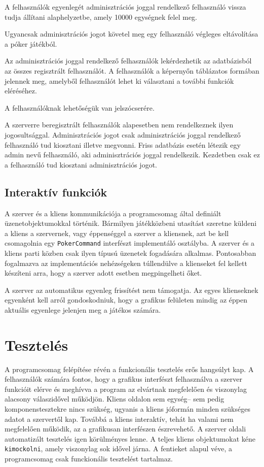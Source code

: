 A felhasználók egyenlegét adminisztrációs joggal rendelkező felhasználó vissza tudja állítani alaphelyzetbe, amely 10000 egységnek felel meg.

Ugyancsak adminisztrációs jogot követel meg egy felhasználó végleges eltávolítása a póker játékból.

Az adminisztrációs joggal rendelkező felhasználók lekérdezhetik az adatbázisból az összes regisztrált felhasználót. A felhasználók a képernyőn táblázatos formában jelennek meg, amelyből felhasználót lehet ki választani a további funkciók eléréséhez.

A felhasználóknak lehetőségük van jelszócserére.

A szerverre beregisztrált felhasználók alapesetben nem rendelkeznek ilyen jogosultsággal. Adminisztrációs jogot csak adminisztrációs joggal rendelkező felhasználó tud kiosztani illetve megvonni. Friss adatbázis esetén létezik egy admin nevű felhasználó, aki adminisztrációs joggal rendelkezik. Kezdetben csak ez a felhasználó tud kiosztani adminisztrációs jogot.

\clearpage

\subsection{Interaktív funkciók}
A szerver és a kliens kommunikációja a programcsomag által definiált üzenetobjektumokkal történik. Bármilyen játékközbeni utasítást szeretne küldeni a kliens a szervernek, vagy éppenséggel a szerver a kliensnek, azt be kell csomagolnia egy \texttt{PokerCommand} interfészt implementáló osztályba. A szerver és a kliens parti közben csak ilyen típusú üzenetek fogadására alkalmas. Pontosabban fogalmazva az implementációs nehézségeken túllendülve a klienseket fel kellett készíteni arra, hogy a szerver adott esetben megpingelheti őket.

A szerver az automatikus egyenleg frissítést nem támogatja. Az egyes klienseknek egyenként kell arról gondoskodniuk, hogy a grafikus felületen mindig az éppen aktuális egyenlege jelenjen meg a játékos számára.

\section{Tesztelés}
A programcsomag felépítése révén a funkcionális tesztelés erős hangsúlyt kap. A felhasználók számára fontos, hogy a grafikus interfészt felhasználva a szerver funkcióit elérve és meghívva a program az elvártnak megfelelően és viszonylag alacsony válaszidővel működjön. Kliens oldalon sem egység-- sem pedig komponenstesztekre nincs szükség, ugyanis a kliens jóformán minden szükséges adatot a szervertől kap. Továbbá a kliens interaktív, tehát ha valami nem megfelelően működik, az a grafikusan interfészen észrevehető. A szerver oldali automatizált tesztelés igen körülményes lenne. A teljes kliens objektumokat kéne \texttt{kimockolni}, amely viszonylag sok idővel járna. A fentieket alapul véve, a programcsomag csak funckionális tesztelést tartalmaz.
